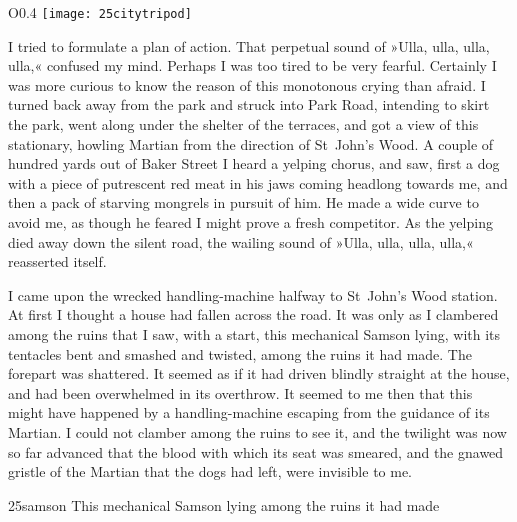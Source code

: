 \begin{wrapfigure}{O}{0.4\textwidth}
\centering
\texttt{[image: 25citytripod]}
\end{wrapfigure}

I tried to formulate a plan of action. That perpetual sound of »Ulla, ulla, ulla, ulla,« confused my mind. Perhaps I was too tired to be very fearful. Certainly I was more curious to know the reason of this monotonous crying than afraid. I turned back away from the park and struck into Park Road, intending to skirt the park, went along under the shelter of the terraces, and got a view of this stationary, howling Martian from the direction of St~John's Wood. A couple of hundred yards out of Baker Street I heard a yelping chorus, and saw, first a dog with a piece of putrescent red meat in his jaws coming headlong towards me, and then a pack of starving mongrels in pursuit of him. He made a wide curve to avoid me, as though he feared I might prove a fresh competitor. As the yelping died away down the silent road, the wailing sound of »Ulla, ulla, ulla, ulla,« reasserted itself.

I came upon the wrecked handling-machine halfway to St~John's Wood station. At first I thought a house had fallen across the road. It was only as I clambered among the ruins that I saw, with a start, this mechanical Samson lying, with its tentacles bent and smashed and twisted, among the ruins it had made. The forepart was shattered. It seemed as if it had driven blindly straight at the house, and had been overwhelmed in its overthrow. It seemed to me then that this might have happened by a handling-machine escaping from the guidance of its Martian. I could not clamber among the ruins to see it, and the twilight was now so far advanced that the blood with which its seat was smeared, and the gnawed gristle of the Martian that the dogs had left, were invisible to me.




\begin{letter}
	\begin{bwbigpic}
		[1.2] 
		{25samson} 
		{This mechanical Samson lying among the ruins it had made} 
	\end{bwbigpic}
\end{letter}

